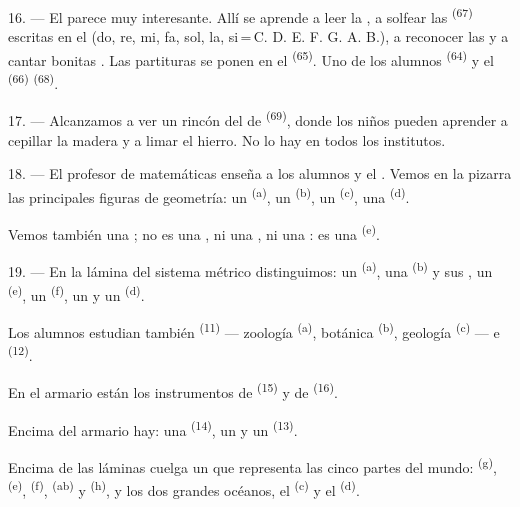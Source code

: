 16. --- El  parece muy interesante. Allí se aprende a
leer la , a solfear las 
\textsuperscript{(67)} escritas en el  (do, re, mi, fa, sol, la,
si\,=\,C. D. E. F. G. A. B.), a reconocer las  y a cantar
bonitas . Las partituras se ponen en el 
\textsuperscript{(65)}. Uno de los alumnos  \textsuperscript{(64)} y
el  \textsuperscript{(66)} 
\textsuperscript{(68)}.

17. --- Alcanzamos a ver un rincón del  de  \textsuperscript{(69)}, donde los niños pueden aprender a cepillar la
madera y a limar el hierro. No lo hay en todos los institutos.

\VUsaut{5.0mm}
\VUsaut{3.6mm}

18. --- El profesor de matemáticas enseña a los alumnos 
 y el . Vemos en la
pizarra las principales figuras de geometría: un 
\textsuperscript{(a)}, un  \textsuperscript{(b)}, un 
\textsuperscript{(c)}, una  \textsuperscript{(d)}.

Vemos también una ; no es una , ni una
, ni una : es una 
\textsuperscript{(e)}.

19. --- En la lámina del sistema métrico distinguimos: un 
\textsuperscript{(a)}, una  \textsuperscript{(b)} y sus , un
 \textsuperscript{(e)}, un  \textsuperscript{(f)}, un
 y un  \textsuperscript{(d)}.

Los alumnos estudian también  \textsuperscript{(11)} ---
zoología \textsuperscript{(a)}, botánica \textsuperscript{(b)}, geología \textsuperscript{(c)}
---
e  \textsuperscript{(12)}.

En el armario están los instrumentos de  \textsuperscript{(15)} y de
 \textsuperscript{(16)}.

Encima del armario hay: una  \textsuperscript{(14)}, un  y
un  \textsuperscript{(13)}.

Encima de las láminas cuelga un  que representa las cinco
partes del mundo:  \textsuperscript{(g)},  \textsuperscript{(e)},
 \textsuperscript{(f)},  \textsuperscript{(ab)} y
 \textsuperscript{(h)}, y los dos grandes océanos, el
 \textsuperscript{(c)} y el  \textsuperscript{(d)}.
\VUsaut{6.0mm}
\VUfilet{22mm}
